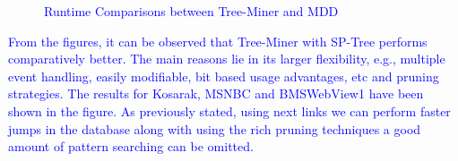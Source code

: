 \begin{figure}[!tb]
\begin{subfigure}{.3\linewidth}
\begin{adjustbox}{max width=\textwidth}
        \end{adjustbox}
        \caption{}
        \end{subfigure}
        \begin{subfigure}{.3\linewidth}
          \centering
        \begin{adjustbox}{max width=\textwidth}
        \end{adjustbox}
        \caption{}
        \end{subfigure}
        \caption{\textcolor{blue}{Runtime Comparisons between Tree-Miner and MDD}}
        \label{graph:runtime_comparison_with_mdd}
        \end{figure}

\textcolor{blue}{From the figures, it can be observed that Tree-Miner with SP-Tree performs comparatively better. The main reasons lie in its larger flexibility, e.g., multiple event handling, easily modifiable, bit based usage advantages, etc and pruning strategies. The results for Kosarak, MSNBC and BMSWebView1 have been shown in the figure. As previously stated, using next links we can perform faster jumps in the database along with using the rich pruning techniques a good amount of pattern searching can be omitted.}


